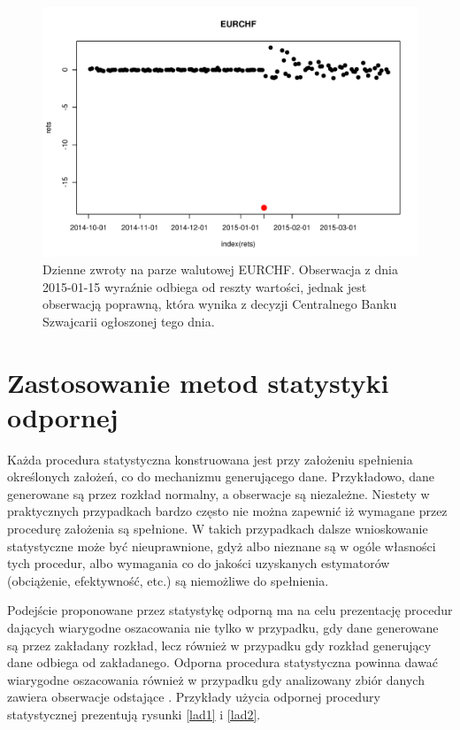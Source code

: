 \documentclass[a4paper,12pt,openany, DIV=calc, headsepline]{scrbook}
\begin{document}
\begin{figure}[H]
  \centering
  \includegraphics[scale=0.5]{wykresy/EURCHF}
  \caption{Dzienne zwroty na parze walutowej EURCHF. Obserwacja z dnia 2015-01-15 wyraźnie odbiega od reszty wartości, jednak jest obserwacją poprawną, która wynika z decyzji Centralnego Banku Szwajcarii ogłoszonej tego dnia.}
  \label{fig:eurchf}
\end{figure}


\section{Zastosowanie metod statystyki odpornej}

Każda procedura statystyczna konstruowana jest przy założeniu spełnienia określonych założeń, co do mechanizmu generującego dane. Przykładowo, dane generowane są przez rozkład normalny, a obserwacje są niezależne. Niestety w praktycznych przypadkach bardzo często nie można zapewnić iż wymagane przez procedurę założenia są spełnione. W takich przypadkach dalsze wnioskowanie statystyczne może być nieuprawnione, gdyż albo nieznane są w ogóle własności tych procedur, albo wymagania co do jakości uzyskanych estymatorów (obciążenie, efektywność, etc.) są niemożliwe do spełnienia.

Podejście proponowane przez statystykę odporną ma na celu prezentację procedur dających wiarygodne oszacowania nie tylko w przypadku, gdy dane generowane są przez zakładany rozkład, lecz również w przypadku gdy rozkład generujący dane odbiega od zakładanego. Odporna procedura statystyczna powinna dawać wiarygodne oszacowania również w przypadku gdy analizowany zbiór danych zawiera obserwacje odstające \citep{Van:2000}. Przykłady użycia odpornej procedury statystycznej prezentują rysunki \ref{lad1} i \ref{lad2}.
\end{document}
